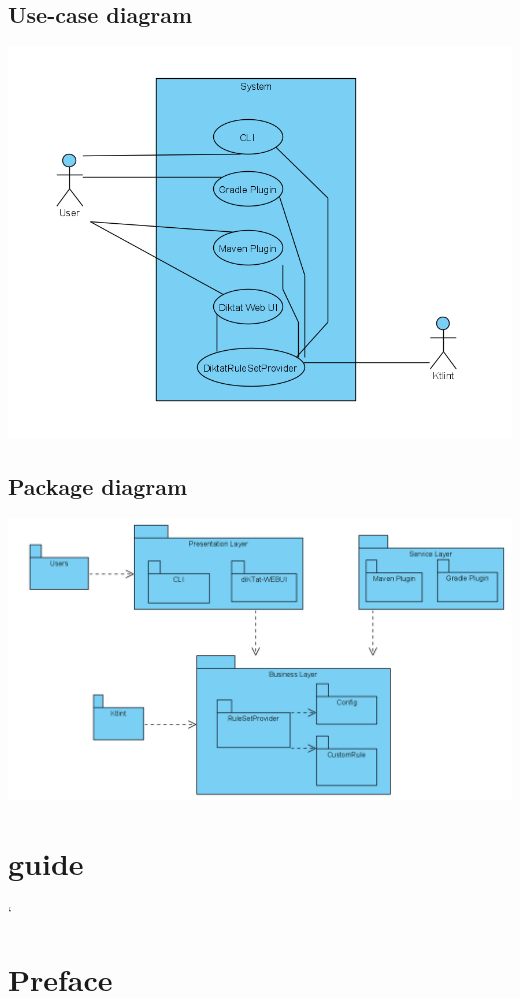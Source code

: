 \subsection{Use-case diagram}
\includegraphics[scale=0.8]{pictures/useCase.png}
\subsection{Package diagram}
\includegraphics[scale=0.65]{pictures/package.png}
\section*{guide}

\lstMakeShortInline[basicstyle=\ttfamily\bfseries]`

\section*{\textbf{Preface}}


